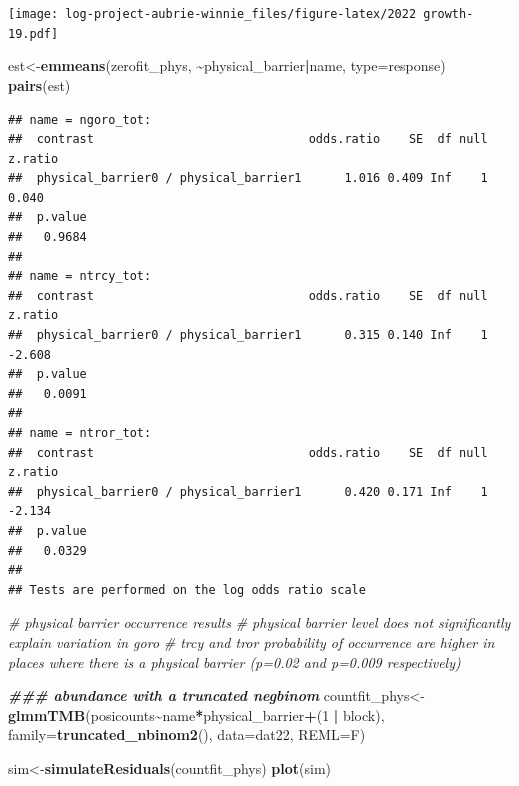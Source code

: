 \documentclass[
]{article}
\newenvironment{Shaded}{\begin{snugshade}}{\end{snugshade}}
\newcommand{\AttributeTok}[1]{\textcolor[rgb]{0.13,0.29,0.53}{#1}}
\newcommand{\CommentTok}[1]{\textcolor[rgb]{0.56,0.35,0.01}{\textit{#1}}}
\newcommand{\DecValTok}[1]{\textcolor[rgb]{0.00,0.00,0.81}{#1}}
\newcommand{\DocumentationTok}[1]{\textcolor[rgb]{0.56,0.35,0.01}{\textbf{\textit{#1}}}}
\newcommand{\FunctionTok}[1]{\textcolor[rgb]{0.13,0.29,0.53}{\textbf{#1}}}
\newcommand{\NormalTok}[1]{#1}
\newcommand{\OtherTok}[1]{\textcolor[rgb]{0.56,0.35,0.01}{#1}}
\newcommand{\SpecialCharTok}[1]{\textcolor[rgb]{0.81,0.36,0.00}{\textbf{#1}}}
\newcommand{\StringTok}[1]{\textcolor[rgb]{0.31,0.60,0.02}{#1}}
\begin{document}
\texttt{[image: log-project-aubrie-winnie\_files/figure-latex/2022 growth-19.pdf]}

\begin{Shaded}
\begin{Highlighting}[]
\NormalTok{est}\OtherTok{\textless{}{-}}\FunctionTok{emmeans}\NormalTok{(zerofit\_phys, }\SpecialCharTok{\textasciitilde{}}\NormalTok{physical\_barrier}\SpecialCharTok{|}\NormalTok{name, }\AttributeTok{type=}\StringTok{\textquotesingle{}response\textquotesingle{}}\NormalTok{)}
\FunctionTok{pairs}\NormalTok{(est)}
\end{Highlighting}
\end{Shaded}

\begin{verbatim}
## name = ngoro_tot:
##  contrast                              odds.ratio    SE  df null z.ratio
##  physical_barrier0 / physical_barrier1      1.016 0.409 Inf    1   0.040
##  p.value
##   0.9684
## 
## name = ntrcy_tot:
##  contrast                              odds.ratio    SE  df null z.ratio
##  physical_barrier0 / physical_barrier1      0.315 0.140 Inf    1  -2.608
##  p.value
##   0.0091
## 
## name = ntror_tot:
##  contrast                              odds.ratio    SE  df null z.ratio
##  physical_barrier0 / physical_barrier1      0.420 0.171 Inf    1  -2.134
##  p.value
##   0.0329
## 
## Tests are performed on the log odds ratio scale
\end{verbatim}

\begin{Shaded}
\begin{Highlighting}[]
\CommentTok{\# physical barrier occurrence results}
\CommentTok{\# physical barrier level does not significantly explain variation in goro }
\CommentTok{\# trcy and tror probability of occurrence are higher in places where there is a physical barrier (p=0.02 and p=0.009 respectively)}

\DocumentationTok{\#\#\# abundance with a truncated negbinom }
\NormalTok{countfit\_phys}\OtherTok{\textless{}{-}}\FunctionTok{glmmTMB}\NormalTok{(posicounts}\SpecialCharTok{\textasciitilde{}}\NormalTok{name}\SpecialCharTok{*}\NormalTok{physical\_barrier}\SpecialCharTok{+}\NormalTok{(}\DecValTok{1} \SpecialCharTok{|}\NormalTok{ block), }\AttributeTok{family=}\FunctionTok{truncated\_nbinom2}\NormalTok{(), }\AttributeTok{data=}\NormalTok{dat22, }\AttributeTok{REML=}\NormalTok{F)}

\NormalTok{sim}\OtherTok{\textless{}{-}}\FunctionTok{simulateResiduals}\NormalTok{(countfit\_phys)}
\FunctionTok{plot}\NormalTok{(sim)}
\end{Highlighting}
\end{Shaded}
\end{document}

